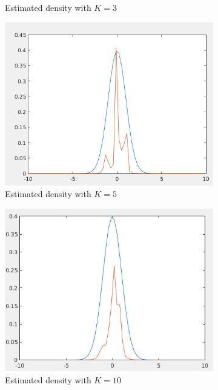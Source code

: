 \documentclass[12pt]{article}
\begin{document}
\begin{itemize}
\begin{figure}
\begin{subfigure}{0.45\textwidth}
\caption{Estimated density with $K = 3$}
\end{subfigure}
\begin{subfigure}{0.45\textwidth}
\centering
\includegraphics[scale=0.35]{Imgs/5-14.png}
\caption{Estimated density with $K = 5$}
\end{subfigure}
\begin{subfigure}{0.45\textwidth}
\centering
\includegraphics[scale=0.35]{Imgs/5-15.png}
\caption{Estimated density with $K = 10$}
\end{subfigure}
\begin{subfigure}{0.45\textwidth}
\centering

\end{subfigure}
\end{figure}
\end{itemize}
\end{document}
